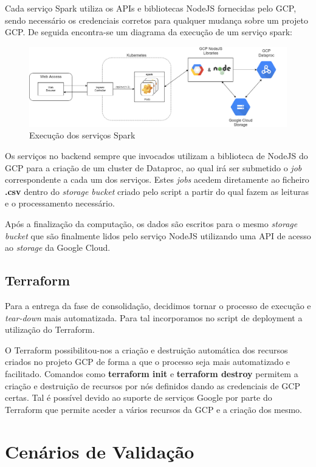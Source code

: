 \documentclass[11pt,a4paper]{article}
\begin{document}
Cada serviço Spark utiliza os APIs e bibliotecas NodeJS fornecidas pelo GCP, sendo necessário os credenciais corretos para qualquer mudança sobre um projeto GCP. De seguida encontra-se um diagrama da execução de um serviço spark:

\begin{figure}[H]
  \centering
  \includegraphics[scale=0.32]{spark_ex.png}
  \caption{Execução dos serviços Spark}
\end{figure}

Os serviços no backend sempre que invocados utilizam a biblioteca de NodeJS do GCP para a criação de um cluster de Dataproc, ao qual irá ser submetido o \textit{job} correspondente a cada um dos serviços. Estes \textit{jobs} acedem diretamente ao ficheiro \textbf{.csv} dentro do \textit{storage bucket} criado pelo script a partir do qual fazem as leituras e o processamento necessário. 

Após a finalização da computação, os dados são escritos para o mesmo \textit{storage bucket} que são finalmente lidos pelo serviço NodeJS utilizando uma API de acesso ao \textit{storage} da Google Cloud.

\subsection{Terraform}
Para a entrega da fase de consolidação, decidimos tornar o processo de execução e \textit{tear-down} mais automatizada. Para tal incorporamos no script de deployment a utilização do Terraform.

O Terraform possibilitou-nos a criação e destruição automática dos recursos criados no projeto GCP de forma a que o processo seja mais automatizado e facilitado. Comandos como \textbf{terraform init} e \textbf{terraform destroy} permitem a criação e destruição de recursos por nós definidos dando as credenciais de GCP certas. Tal é possível devido ao suporte de serviços Google por parte do Terraform que permite aceder a vários recursos da GCP e a criação dos mesmo.

\section{Cenários de Validação}
\end{document}
